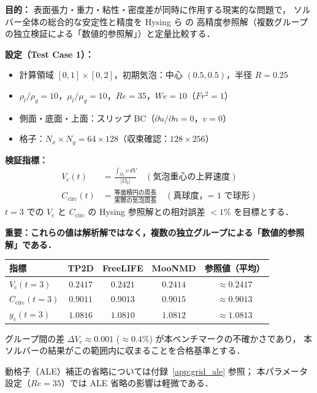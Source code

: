 \textbf{目的：}
表面張力・重力・粘性・密度差が同時に作用する現実的な問題で，
ソルバー全体の総合的な安定性と精度を Hysing ら \cite{Hysing2009} の
高精度参照解（複数グループの独立検証による「数値的参照解」）と定量比較する．

\textbf{設定（Test Case 1）：}
\begin{itemize}
  \item 計算領域 $[0, 1] \times [0, 2]$，初期気泡：中心 $(0.5, 0.5)$，半径 $R = 0.25$
  \item $\rho_l / \rho_g = 10$，$\mu_l / \mu_g = 10$，$Re = 35$，$We = 10$（$Fr^2 = 1$）
  \item 側面・底面・上面：スリップ BC（$\partial u/\partial n = 0$，$v = 0$）
  \item 格子：$N_x \times N_y = 64 \times 128$（収束確認：$128 \times 256$）
\end{itemize}

\textbf{検証指標：}
\begin{align}
  V_c(t) &= \frac{\int_{\Omega_b} v \, dV}{|\Omega_b|}
  \quad (\text{気泡重心の上昇速度}) \label{eq:bubble_vc_val} \\
  C_{\mathrm{circ}}(t) &= \frac{\text{等面積円の周長}}{\text{実際の気泡周長}}
  \quad (\text{真球度，= 1 で球形}) \label{eq:bubble_circ_val}
\end{align}
$t = 3$ での $V_c$ と $C_{\mathrm{circ}}$ の Hysing 参照解との相対誤差 $< 1\%$ を目標とする．

\begin{tcolorbox}[resultbox, title={Hysing (2009) Test Case 1 の参照値（数値参照解）}]
\textbf{重要：これらの値は解析解ではなく，複数の独立グループによる「数値的参照解」である．}

\begin{center}
\renewcommand{\arraystretch}{1.3}
\begin{tabular}{lcccc}
\toprule
指標 & TP2D & FreeLIFE & MooNMD & 参照値（平均） \\
\midrule
$V_c(t=3)$ & $0.2417$ & $0.2421$ & $0.2414$ & $\approx 0.2417$ \\
$C_{\mathrm{circ}}(t=3)$ & $0.9011$ & $0.9013$ & $0.9015$ & $\approx 0.9013$ \\
$y_c(t=3)$ & $1.0816$ & $1.0810$ & $1.0812$ & $\approx 1.0813$ \\
\bottomrule
\end{tabular}
\end{center}

グループ間の差 $\Delta V_c \approx 0.001$ ($\approx 0.4\%$) が本ベンチマークの不確かさであり，
本ソルバーの結果がこの範囲内に収まることを合格基準とする．

動格子（ALE）補正の省略については付録~\ref{app:grid_ale} 参照；
本パラメータ設定（$Re = 35$）では ALE 省略の影響は軽微である．
\end{tcolorbox}

